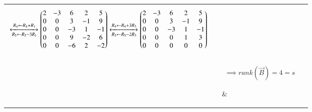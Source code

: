\documentclass[journal,12pt]{IEEEtran}
\begin{document}
\begin{longtable}{|l|l|l|}
{\begin{align}
    &\xleftrightarrow[R_5\leftarrow R_5-3R_1]{R_4\leftarrow R_4+R_1}\begin{pmatrix}2&-3&6&2&5\\0&0&3&-1&9\\0&0&-3&1&-1\\0&0&9&-2&6\\0&0&-6&2&-2\end{pmatrix}\xleftrightarrow[R_5\leftarrow R_5-2R_3]{R_4\leftarrow R_4+3R_3}\begin{pmatrix}2&-3&6&2&5\\0&0&3&-1&9\\0&0&-3&1&-1\\0&0&0&1&3\\0&0&0&0&0\end{pmatrix}
\end{align}}&\\&\parbox{14cm}{\begin{align}
    \implies rank(\vec{B})=4=s\label{rb}
\end{align}}&\\&Now matrix $\vec{P}$ will be&\\&\parbox{14cm}{\begin{align}
    \vec{P}&=\vec{B}-\vec{A}\\
    \implies\vec{P}&=\myvec{0&0&0&0&0\\0&0&0&0&8\\0&0&0&0&0\\0&0&0&0&0\\0&0&0&0&0}\label{P}\\
    \implies rank(\vec{P})&=1
\end{align}}&\\&Now we will see equation \eqref{p1} is satisfied or not&\\&\parbox{14cm}{\begin{align}
    s\leq r+1\implies4\leq3+1\implies4\leq4
\end{align}}&\\&Hence satisfied&\\
.&From \eqref{APB}, If $\vec{P}=-\vec{Q}$ then we can get as below&\\&\parbox{14cm}{\begin{align}
    \vec{A}-\vec{Q}=\vec{B}\\
    \implies\vec{B}+\vec{Q}=\vec{A}\label{BQP}
\end{align}}&\\&Since matrix $\vec{Q}$ also consists only single element we can say that $rank(Q)=1$&True\\&From \eqref{prop}, \eqref{BQP}, we get&\\&\parbox{14cm}{\begin{align}
    rank(\vec{B}+\vec{Q})&\leq rank(\vec{B})+rank(\vec{Q})\\

\end{align}}
\end{longtable}
\end{document}
